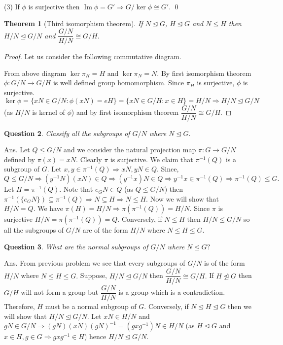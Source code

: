 \documentclass[11pt]{amsart}
\newtheorem{theorem}{Theorem}[section]
\newtheorem{qns}[theorem]{Question}
\DeclareMathOperator{\im}{\text{Im}}
\begin{document}
(3) If $\phi$ is surjective then $\im\phi=G' \Rightarrow G/\ker\phi\cong G'.$ \qed
\begin{theorem}[Third isomorphism theorem]
If $N\unlhd G$, $H\unlhd G$ and $N\leq H$ then $H/N\unlhd G/N$ and $\dfrac{G/N}{H/N}\cong G/H.$
\end{theorem}
\begin{proof} Let us consider the following commutative diagram.
\begin{center}
\end{center}
From above diagram $\ker\pi_H=H$ and $\ker\pi_N=N$. By first isomorphism theorem $\phi:G/N\to G/H$ is well defined group homomorphism. Since $\pi_H$ is surjective, $\phi$ is surjective. $\ker\phi=\{xN\in G/N:\phi(xN)=eH\}=\{xN\in G/H:x\in H\}=H/N \Rightarrow H/N\unlhd G/N$ (as $H/N$ is kernel of $\phi$) and by first isomorphism theorem $\dfrac{G/N}{H/N}\cong G/H.$ 
\end{proof}

\begin{qns}
Classify all the subgroups of $G/N$ where $N\unlhd G.$
\end{qns}
Ans. Let $Q\leq G/N$ and we consider the natural projection map $\pi:G\to G/N$ defined by $\pi(x)=xN.$ Clearly $\pi$ is surjective. We claim that $\pi^{-1}(Q)$ is a subgroup of $G.$ Let $x,y\in \pi^{-1}(Q) \Rightarrow xN,yN\in Q.$ Since, $Q\leq G/N \Rightarrow (y^{-1}N)(xN)\in Q \Rightarrow (y^{-1}x)N \in Q \Rightarrow y^{-1}x\in \pi^{-1}(Q) \Rightarrow \pi^{-1}(Q)\leq G.$ Let $H=\pi^{-1}(Q).$ Note that $e_GN\in Q$ (as $Q\leq G/N$) then $\pi^{-1}(\{e_GN\})\subseteq \pi^{-1}(Q) \Rightarrow N\subseteq H \Rightarrow N\leq H.$ Now we will show that $H/N=Q.$ We have $\pi(H)=H/N \Rightarrow \pi(\pi^{-1}(Q))=H/N.$ Since $\pi$ is surjective $H/N=\pi(\pi^{-1}(Q))=Q.$ Conversely, if $N\leq H$ then $H/N\leq G/N$ so all the subgroups of $G/N$ are of the form $H/N$ where $N\leq H\leq G.$
\begin{qns}
What are the normal subgroups of $G/N$ where $N\unlhd G?$
\end{qns}
Ans. From previous problem we see that every subgroups of $G/N$ is of the form $H/N$ where $N\leq H\leq G.$ Suppose, $H/N\unlhd G/N$ then $\dfrac{G/N}{H/N}\cong G/H.$ If $H\ntrianglelefteq G$ then $G/H$ will not form a group but $\dfrac{G/N}{H/N}$ is a group which is a contradiction. Therefore, $H$ must be a normal subgroup of $G.$ Conversely, if $N\unlhd H\unlhd G$ then we will show that $H/N\unlhd G/N$. Let $xN\in H/N$ and $gN\in G/N \Rightarrow (gN)(xN)(gN)^{-1}=(gxg^{-1})N\in H/N$ (as $H\unlhd G$ and $x\in H,g\in G \Rightarrow gxg^{-1}\in H$) hence $H/N\unlhd G/N.$
\end{document}
